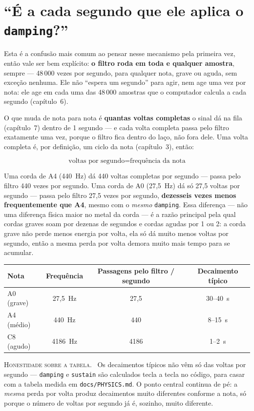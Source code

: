 \documentclass[11pt,oneside]{book}
\newcommand{\nova}[1]{\textsc{\color{accent}#1.}~}
\begin{document}
\section*{\enquote{É a cada segundo que ele aplica o \texttt{damping}?}}

Esta é a confusão mais comum ao pensar nesse mecanismo pela primeira vez,
então vale ser bem explícito: \textbf{o filtro roda em toda e qualquer
amostra}, sempre --- 48\,000 vezes por segundo, para qualquer nota, grave
ou aguda, sem exceção nenhuma. Ele não \enquote{espera um segundo} para
agir, nem age uma vez por nota: ele age em cada uma das 48\,000 amostras
que o computador calcula a cada segundo (capítulo~6).

O que muda de nota para nota é \textbf{quantas voltas completas} o sinal
dá na fila (capítulo~7) dentro de 1 segundo --- e cada volta completa
passa pelo filtro exatamente uma vez, porque o filtro fica dentro do laço,
não fora dele. Uma volta completa é, por definição, um ciclo da nota
(capítulo~3), então:

\[
\text{voltas por segundo} = \text{frequência da nota}
\]

Uma corda de A4 (440~Hz) dá 440 voltas completas por segundo --- passa
pelo filtro 440 vezes por segundo. Uma corda de A0 (27,5~Hz) dá só 27,5
voltas por segundo --- passa pelo filtro 27,5 vezes por segundo,
\textbf{dezesseis vezes menos frequentemente que A4}, mesmo com o
\emph{mesmo} \texttt{damping}. Essa diferença --- não uma diferença física
maior no metal da corda --- é a razão principal pela qual cordas graves
soam por dezenas de segundos e cordas agudas por 1 ou 2: a corda grave não
perde menos energia por volta, ela só dá muito menos voltas por segundo,
então a mesma perda por volta demora muito mais tempo para se acumular.

\begin{center}
\begin{tabular}{lccc}
\toprule
Nota & Frequência & Passagens pelo filtro / segundo & Decaimento típico \\
\midrule
A0 (grave) & 27,5~Hz & 27,5 & 30--40~s \\
A4 (médio) & 440~Hz & 440 & 8--15~s \\
C8 (agudo) & 4186~Hz & 4186 & 1--2~s \\
\bottomrule
\end{tabular}
\end{center}

\begin{newword}
\nova{Honestidade sobre a tabela} Os decaimentos típicos não vêm só das
voltas por segundo --- \texttt{damping} e \texttt{sustain} são calculados
tecla a tecla no código, para casar com a tabela medida em
\texttt{docs/PHYSICS.md}. O ponto central continua de pé: a
\emph{mesma} perda por volta produz decaimentos muito diferentes conforme
a nota, só porque o número de voltas por segundo já é, sozinho, muito
diferente.
\end{newword}
\end{document}
